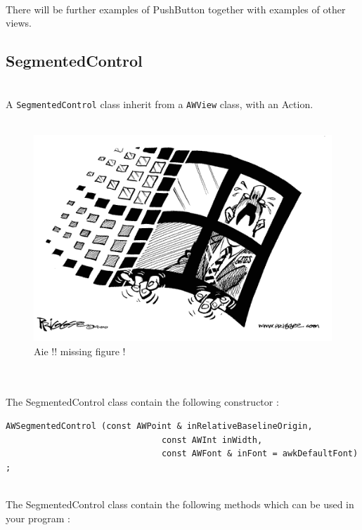 \documentclass[a4paper,11pt]{extarticle}
\begin{document}
~\\There will be further examples of PushButton together with examples of other views.

\newpage
\subsection{SegmentedControl}

~\\ A \texttt{SegmentedControl} class inherit from a \texttt{AWView} class, with an Action.
~\\
~\\

\begin{figure}[htbp]
   \centering
   \includegraphics[scale=0.55]{AWFig.png} 
   \caption{Aie !! missing figure !}
   \label{fig:11}
\end{figure}

~\\

~\\ The SegmentedControl class contain the following constructor :

\begin{lstlisting}[language=Arduinonl]
  AWSegmentedControl (const AWPoint & inRelativeBaselineOrigin,
                               const AWInt inWidth,
                               const AWFont & inFont = awkDefaultFont) ;
\end{lstlisting}

~\\ The SegmentedControl class contain the following methods which can be used in your program :
\end{document}
